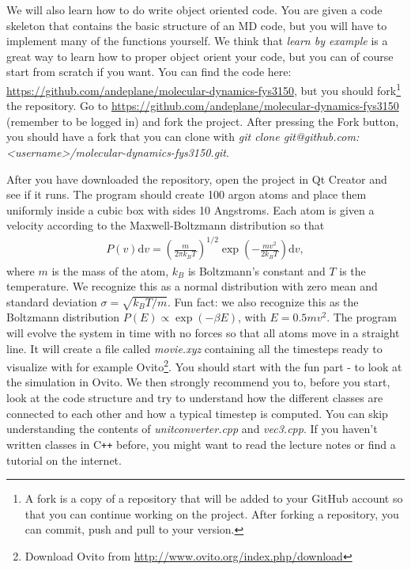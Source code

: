 \documentclass[a4wide,12pt]{article}
\newcommand{\dm}[1]{\mathrm{d}#1}
\begin{document}
We will also learn how to do write object oriented code. You are given a code skeleton that contains the basic structure of an MD code, but you will have to implement many of the functions yourself. We think that \textit{learn by example} is a great way to learn how to proper object orient your code, but you can of course start from scratch if you want. You can find the code here: \url{https://github.com/andeplane/molecular-dynamics-fys3150}, but you should fork\footnote{A fork is a copy of a repository that will be added to your GitHub account so that you can continue working on the project. After forking a repository, you can commit, push and pull to your version.} the repository. Go to \url{https://github.com/andeplane/molecular-dynamics-fys3150} (remember to be logged in) and fork the project. After pressing the Fork button, you should have a fork that you can clone with \textit{git clone git@github.com:<username>/molecular-dynamics-fys3150.git}.

After you have downloaded the repository, open the project in Qt Creator and see if it runs. The program should create 100 argon atoms and place them uniformly inside a cubic box with sides 10 Angstroms. Each atom is given a velocity according to the Maxwell-Boltzmann distribution so that
\begin{align}
	\label{eq:maxwell_boltzmann}
	P(v)\dm{v} = \left(\frac{m}{2\pi k_B T}\right)^{1/2} \exp\left(-\frac{m v^2}{2k_B T}\right) \dm{v},
\end{align}
where $m$ is the mass of the atom, $k_B$ is Boltzmann's constant and $T$ is the temperature. We recognize this as a normal distribution with zero mean and standard deviation $\sigma = \sqrt{k_B T/m}$. Fun fact: we also recognize this as the Boltzmann distribution $P(E) \propto \exp{(-\beta E)}$, with $E = 0.5mv^2$. The program will evolve the system in time with no forces so that all atoms move in a straight line. It will create a file called \textit{movie.xyz} containing all the timesteps ready to visualize with for example Ovito\footnote{Download Ovito from \url{http://www.ovito.org/index.php/download}}. You should start with the fun part - to look at the simulation in Ovito. We then strongly recommend you to, before you start, look at the code structure and try to understand how the different classes are connected to each other and how a typical timestep is computed. You can skip understanding the contents of \textit{unitconverter.cpp} and \textit{vec3.cpp}. If you haven't written classes in C{}\verb!++! before, you might want to read the lecture notes or find a tutorial on the internet. 
\end{document}
